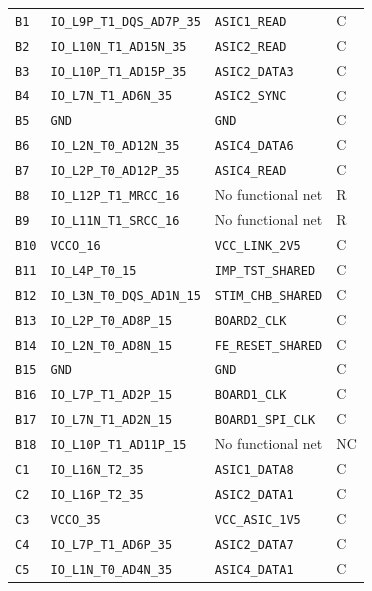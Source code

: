 \documentclass[10pt,a4paper]{article}
\begin{document}
\begin{longtable}{@{}P{15mm}P{42mm}P{92mm}P{10mm}@{}}
\nolinkurl{B1} & \nolinkurl{IO_L9P_T1_DQS_AD7P_35} & \nolinkurl{ASIC1_READ} & C \\
\nolinkurl{B2} & \nolinkurl{IO_L10N_T1_AD15N_35} & \nolinkurl{ASIC2_READ} & C \\
\nolinkurl{B3} & \nolinkurl{IO_L10P_T1_AD15P_35} & \nolinkurl{ASIC2_DATA3} & C \\
\nolinkurl{B4} & \nolinkurl{IO_L7N_T1_AD6N_35} & \nolinkurl{ASIC2_SYNC} & C \\
\nolinkurl{B5} & \nolinkurl{GND} & \nolinkurl{GND} & C \\
\nolinkurl{B6} & \nolinkurl{IO_L2N_T0_AD12N_35} & \nolinkurl{ASIC4_DATA6} & C \\
\nolinkurl{B7} & \nolinkurl{IO_L2P_T0_AD12P_35} & \nolinkurl{ASIC4_READ} & C \\
\nolinkurl{B8} & \nolinkurl{IO_L12P_T1_MRCC_16} & No functional net & R \\
\nolinkurl{B9} & \nolinkurl{IO_L11N_T1_SRCC_16} & No functional net & R \\
\nolinkurl{B10} & \nolinkurl{VCCO_16} & \nolinkurl{VCC_LINK_2V5} & C \\
\nolinkurl{B11} & \nolinkurl{IO_L4P_T0_15} & \nolinkurl{IMP_TST_SHARED} & C \\
\nolinkurl{B12} & \nolinkurl{IO_L3N_T0_DQS_AD1N_15} & \nolinkurl{STIM_CHB_SHARED} & C \\
\nolinkurl{B13} & \nolinkurl{IO_L2P_T0_AD8P_15} & \nolinkurl{BOARD2_CLK} & C \\
\nolinkurl{B14} & \nolinkurl{IO_L2N_T0_AD8N_15} & \nolinkurl{FE_RESET_SHARED} & C \\
\nolinkurl{B15} & \nolinkurl{GND} & \nolinkurl{GND} & C \\
\nolinkurl{B16} & \nolinkurl{IO_L7P_T1_AD2P_15} & \nolinkurl{BOARD1_CLK} & C \\
\nolinkurl{B17} & \nolinkurl{IO_L7N_T1_AD2N_15} & \nolinkurl{BOARD1_SPI_CLK} & C \\
\nolinkurl{B18} & \nolinkurl{IO_L10P_T1_AD11P_15} & No functional net & NC \\
\nolinkurl{C1} & \nolinkurl{IO_L16N_T2_35} & \nolinkurl{ASIC1_DATA8} & C \\
\nolinkurl{C2} & \nolinkurl{IO_L16P_T2_35} & \nolinkurl{ASIC2_DATA1} & C \\
\nolinkurl{C3} & \nolinkurl{VCCO_35} & \nolinkurl{VCC_ASIC_1V5} & C \\
\nolinkurl{C4} & \nolinkurl{IO_L7P_T1_AD6P_35} & \nolinkurl{ASIC2_DATA7} & C \\
\nolinkurl{C5} & \nolinkurl{IO_L1N_T0_AD4N_35} & \nolinkurl{ASIC4_DATA1} & C \\

\end{longtable}
\end{document}
